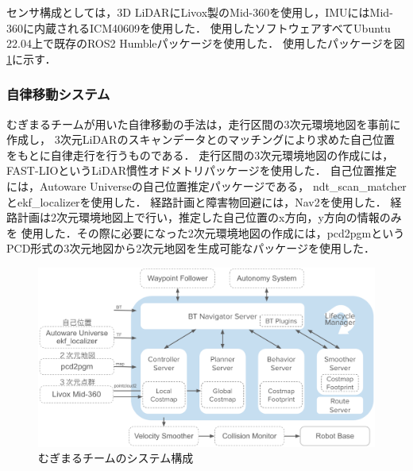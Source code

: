 \documentclass[twocolumn,9pt]{jsproceedings}
\begin{document}
センサ構成としては，3D LiDARにLivox製のMid-360を使用し，IMUにはMid-360に内蔵されるICM40609を使用した．
使用したソフトウェアすべてUbuntu 22.04上で既存のROS2 Humbleパッケージを使用した．
使用したパッケージを図\ref{fig:mugimaru_system}に示す．

\subsubsection{自律移動システム}

むぎまるチームが用いた自律移動の手法は，走行区間の3次元環境地図を事前に作成し，
3次元LiDARのスキャンデータとのマッチングにより求めた自己位置
をもとに自律走行を行うものである．
走行区間の3次元環境地図の作成には，FAST-LIOというLiDAR慣性オドメトリパッケージを使用した．
自己位置推定には，Autoware Universeの自己位置推定パッケージである，
ndt\_scan\_matcherとekf\_localizerを使用した．
経路計画と障害物回避には，Nav2を使用した．
経路計画は2次元環境地図上で行い，推定した自己位置のx方向，y方向の情報のみを
使用した．その際に必要になった2次元環境地図の作成には，pcd2pgmという
PCD形式の3次元地図から2次元地図を生成可能なパッケージを使用した．

\begin{figure}[h]
  \begin{center}
    \includegraphics[width=1.0\linewidth]{figs/mugimaru_system.pdf}
    \caption{むぎまるチームのシステム構成}
    \label{fig:mugimaru_system}
  \end{center}
\end{figure}

\end{document}
